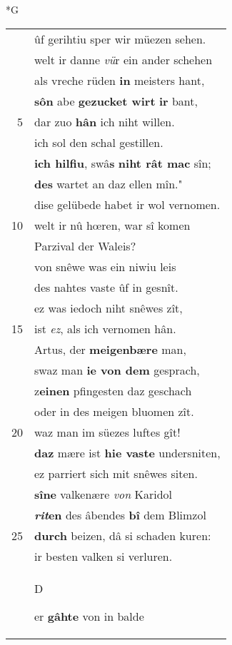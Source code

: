 \documentclass[8pt,a4paper,notitlepage]{article}
\begin{document}
\newpage
\begin{table}[ht]
\begin{minipage}[t]{0.5\linewidth}
\small
\begin{center}*G
\end{center}
\begin{tabular}{rl}
 & ûf gerihtiu sper wir müezen sehen.\\ 
 & welt ir danne \textit{vü}r ein ander schehen\\ 
 & als vreche rüden \textbf{in} meisters hant,\\ 
 & \textbf{sôn} abe \textbf{gezucket wirt} \textbf{ir} bant,\\ 
5 & dar zuo \textbf{hân} ich niht willen.\\ 
 & ich sol den schal gestillen.\\ 
 & \textbf{ich hilfiu}, swâ\textbf{s} \textbf{niht rât mac} sîn;\\ 
 & \textbf{des} wartet an daz ellen mîn."\\ 
 & dise gelübede habet ir wol vernomen.\\ 
10 & welt ir nû hœren, war sî komen\\ 
 & Parzival der Waleis?\\ 
 & von snêwe was ein niwiu leis\\ 
 & des nahtes vaste ûf in gesnît.\\ 
 & ez was iedoch niht snêwes zît,\\ 
15 & ist \textit{ez}, als ich vernomen hân.\\ 
 & Artus, der \textbf{meigenbære} man,\\ 
 & swaz man \textbf{ie von dem} gesprach,\\ 
 & z\textbf{einen} pfingesten daz geschach\\ 
 & oder in des meigen bluomen zît.\\ 
20 & waz man im süezes luftes gît!\\ 
 & \textbf{daz} mære ist \textbf{hie vaste} undersniten,\\ 
 & ez parriert sich mit snêwes siten.\\ 
 & \textbf{sîne} valkenære \textit{von} Karidol\\ 
 & \textbf{\textit{rit}en} des âbendes \textbf{bî} dem Blimzol\\ 
25 & \textbf{durch} beizen, dâ si schaden kuren:\\ 
 & ir besten valken si verluren.\\ 
 & \begin{large}D\end{large}er \textbf{gâhte} von in balde\\ 

\end{tabular}
\end{minipage}
\end{table}
\end{document}
